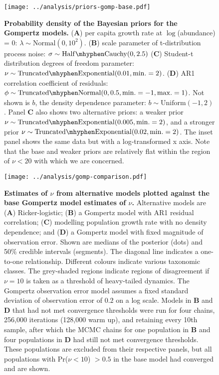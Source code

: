 \documentclass[12pt]{article}
\begin{document}
\begin{figure}[htbp]
\begin{center}
\texttt{[image: ../analysis/priors-gomp-base.pdf]}

\caption{\textbf{Probability density of the Bayesian priors for the Gompertz models.} (\textbf{A}) per capita growth rate at $\log$(abundance) = $0$: $\lambda \sim \mathrm{Normal}(0, 10^2)$. (\textbf{B}) scale parameter of t-distribution process noise: $\sigma \sim \mathrm{Half\mhyphen Cauchy} (0, 2.5)$ (\textbf{C}) Student-t distribution degrees of freedom parameter: $\nu \sim \mathrm{Truncated\mhyphen Exponential}(0.01, \mathrm{min.} = 2)$. (\textbf{D}) AR1 correlation coefficient of residuals: $\phi \sim \mathrm{Truncated \mhyphen Normal}(0, 0.5, \mathrm{min.} = -1, \mathrm{max.} = 1)$. Not shown is $b$, the density dependence parameter: $b \sim \mathrm{Uniform}(-1, 2)$. Panel \textbf{C} also shows two alternative priors: a weaker prior $\nu \sim \mathrm{Truncated\mhyphen Exponential}(0.005, \mathrm{min.} = 2)$, and a stronger prior $\nu \sim \mathrm{Truncated\mhyphen Exponential}(0.02, \mathrm{min.} = 2)$. The inset panel shows the same data but with a log-transformed x axis. Note that the base and weaker priors are relatively flat within the region of $\nu < 20$ with which we are concerned.}

\label{fig:priors}
\end{center}
\end{figure}

\clearpage

\begin{figure}[htbp]
\begin{center}
\texttt{[image: ../analysis/gomp-comparison.pdf]}

\caption{\textbf{Estimates of $\nu$ from alternative models plotted against the
    base Gompertz model estimates of $\nu$.} Alternative models are (\textbf{A})
    Ricker-logistic; (\textbf{B}) a Gompertz model with AR1 residual correlation;
    (\textbf{C}) modelling population growth rate with no density dependence; and
    (\textbf{D}) a Gompertz model with fixed magnitude of observation error. Shown
are medians of the posterior (dots) and 50\% credible intervals (segments). The
diagonal line indicates a one-to-one relationship. Different colours indicate
various taxonomic classes. The grey-shaded regions indicate regions of
disagreement if $\nu = 10$ is taken as a threshold of heavy-tailed dynamics.
The Gompertz observation error model assumes a fixed standard deviation of
observation error of $0.2$ on a log scale. Models in \textbf{B} and \textbf{D}
that had not met convergence thresholds were run for four chains, 256,000 iterations (128,000 warm up), and retaining every 10th sample, after which the MCMC chains for one population in \textbf{B} and four populations in \textbf{D} had still not met convergence thresholds. These populations are excluded from their respective panels, but all populations with Pr($\nu < 10$) $> 0.5$ in the base model had converged and are shown.}

\label{fig:alt}
\end{center}
\end{figure}
\end{document}
